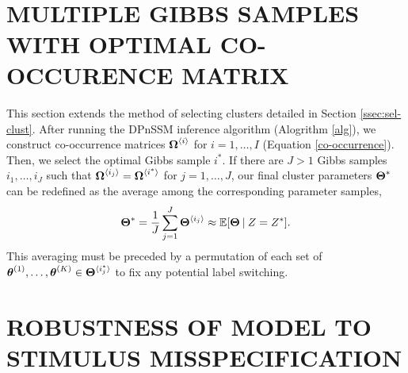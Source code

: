\documentclass[twoside]{article}
\begin{document}
\begin{algorithm}[H]
\begin{algorithmic}[1]
    \EndFor
   	 \EndFor
    \EndFor
    \EndFor \\
   \end{algorithmic}
\end{algorithm}

\section{MULTIPLE GIBBS SAMPLES WITH OPTIMAL CO-OCCURENCE MATRIX} \label{mult-co}
This section extends the method of selecting clusters detailed in Section \ref{ssec:sel-clust}.  After running the DPnSSM inference algorithm (Alogrithm \ref{alg}), we construct co-occurrence matrices $\boldsymbol{\Omega}^{\langle i\rangle}_{}$  for $i = 1, \ldots, I$ (Equation \ref{co-occurrence}).  Then, we select the optimal Gibbs sample $i^*$.  If there are $J > 1$ Gibbs samples $i_1, \ldots, i_J$ such that $\boldsymbol{\Omega}^{\langle i_j\rangle}_{} = \boldsymbol{\Omega}^{\langle i^*\rangle}_{}$ for $j = 1, \ldots, J$, our final cluster parameters $\boldsymbol{\Theta}^*$ can be redefined as the average among the corresponding parameter samples,
\begin{align} \label{final-params}
\boldsymbol{\Theta}^* = \frac{1}{J} \sum_{j=1}^J \boldsymbol{\Theta}^{\langle i_j\rangle}_{} \approx \mathbb{E}[\boldsymbol{\Theta} \:\vert\: Z = Z^*].
\end{align}
This averaging must be preceded by a permutation of each set of $\boldsymbol{\theta}^{(1)}_{}, \ldots, \boldsymbol{\theta}^{(K)}_{} \in \boldsymbol{\Theta}^{\langle i_j^*\rangle}_{}$ to fix any potential label switching.     

\section{ROBUSTNESS OF MODEL TO STIMULUS MISSPECIFICATION} \label{sim-robust}
\end{document}
